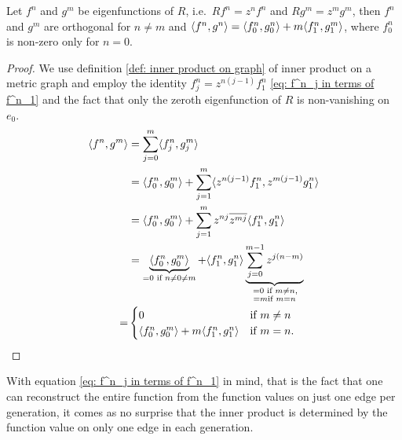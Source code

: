 \begin{proposition}\label{thm: quasi rotation invariant component inner product}
  Let $f^n$ and $g^m$ be eigenfunctions of $R$, i.e.\ $R f^n = z^n f^n$ and $R g^m = z^m g^m$, then
  $f^n$ and $g^m$ are orthogonal for $n \ne m$ and $\langle f^n, g^n \rangle = \langle f^n_0, g^n_0 \rangle + m \langle f^n_1, g^m_1 \rangle$, where $f^n_0$ is non-zero only for $n=0$.
\end{proposition}
\begin{proof}
  We use definition \ref{def: inner product on graph} of inner product on a metric graph and employ the identity $f^n_j = z^{n(j-1)} f^n_1$ \eqref{eq: f^n_j in terms of f^n_1} and the fact that only the zeroth eigenfunction of $R$ is non-vanishing on $e_0$.
  \begin{align*}
    \langle f^n, g^m \rangle &=
    \sum_{j=0}^{m} \langle f^n_j, g^m_j \rangle \\ &=
    \langle f^n_0, g^m_0 \rangle + \sum_{j=1}^{m} \langle z^{n(j-1)} f^n_1, z^{m(j-1)} g^n_1 \rangle \\ &=
    \langle f^n_0, g^m_0 \rangle + \sum_{j=1}^{m} z^{nj} \overline{z^{mj}} \langle f^n_1, g^n_1 \rangle \\ &=
    \underbrace{\langle f^n_0, g^m_0 \rangle}_{=0 \text{ if } n \ne 0 \ne m} + \langle f^n_1, g^n_1 \rangle \underbrace{\sum_{j=0}^{m-1} z^{j(n-m)}}
    _{\substack{
      \,= 0 \text{ if } m \ne n, \\
      = m \text{if } m = n
    }} \\ =&
    \begin{cases}
      0 & \text{if } m \ne n \\
      \langle f^n_0, g^m_0 \rangle + m \langle f^n_1, g^n_1 \rangle & \text{if } m = n.
    \end{cases}
  \end{align*}
\end{proof}

With equation \eqref{eq: f^n_j in terms of f^n_1} in mind, that is the fact that one can reconstruct the entire function from the function values on just one edge per generation, it comes as no surprise that the inner product is determined by the function value on only one edge in each generation.


